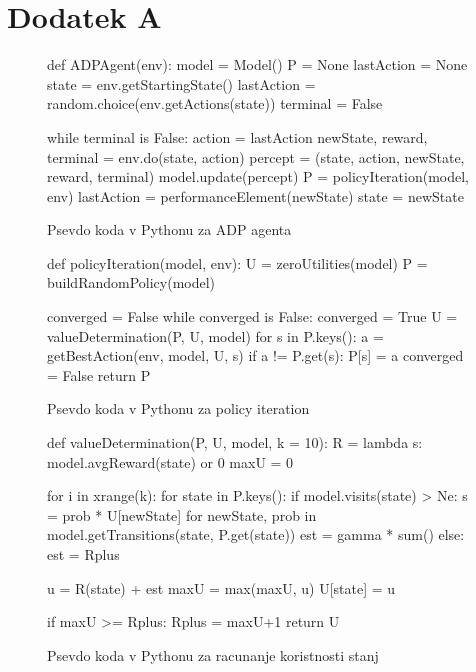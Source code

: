\documentclass[a4paper]{article}
\begin{document}
\section{Dodatek A}
\begin{figure}[htb]
\begin{python}
def ADPAgent(env):
	model = Model()
	P = None
	lastAction = None
	state = env.getStartingState()
	lastAction = random.choice(env.getActions(state))
	terminal = False

	while terminal is False:
		action = lastAction
		newState, reward, terminal = env.do(state, action)
		percept = (state, action, newState, reward, terminal)
		model.update(percept)
		P = policyIteration(model, env)
		lastAction = performanceElement(newState)
		state = newState
\end{python}
\caption{Psevdo koda v Pythonu za ADP agenta}
\end{figure}

\begin{figure}[htb]
\begin{python}
def policyIteration(model, env):
    U = zeroUtilities(model)
    P = buildRandomPolicy(model)	
   
    converged = False
    while converged is False:
        converged = True
        U = valueDetermination(P, U, model)
        for s in P.keys():
            a = getBestAction(env, model, U, s)
            if a != P.get(s):
                P[s] = a
                converged = False
    return P
\end{python}
\caption{Psevdo koda v Pythonu za policy iteration}
\end{figure}

\begin{figure}[htb]
\begin{python}
def valueDetermination(P, U, model, k = 10):
    R = lambda s: model.avgReward(state) or 0
    maxU = 0

    for i in xrange(k):
        for state in P.keys():
            if model.visits(state) > Ne:
                s = prob * U[newState] for newState, prob in 
                    model.getTransitions(state, P.get(state))
                est = gamma * sum()
            else:
                est = Rplus

            u = R(state) + est
            maxU = max(maxU, u)
            U[state] = u
        
            if maxU >= Rplus:
                Rplus = maxU+1
        return U
\end{python}
\caption{Psevdo koda v Pythonu za racunanje koristnosti stanj}
\end{figure}
\end{document}
